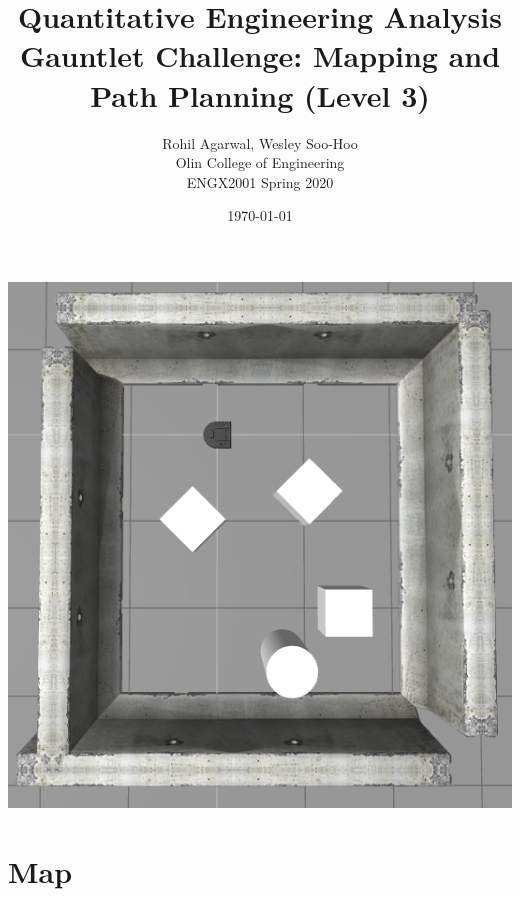 
\usepackage{amsmath}

\title{Quantitative Engineering Analysis \\ Gauntlet Challenge: Mapping and Path Planning (Level 3)}

\author{Rohil Agarwal, Wesley Soo-Hoo \\ Olin College of Engineering \\ ENGX2001 Spring 2020}
\date{\today}


\begin{titlepage}
\maketitle

\begin{center}
\includegraphics[width=.75\textwidth]{img/CaptureGauntletCover.PNG}
\end{center}
\end{titlepage}



\section{Map}

